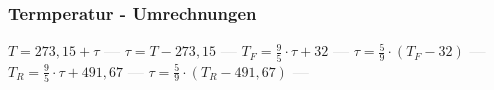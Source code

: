 \subsubsection{Termperatur - Umrechnungen} 
\begin{minipage}{0.45\textwidth} 
\end{minipage} 
\begin{minipage}{0.45\textwidth} 
 
\end{minipage} 
$ T = 273,15 + \tau $ \textcolor{lightgray}{\textbf{---}} 
$ \tau  = T-273,15 $ \textcolor{lightgray}{\textbf{---}} 
$ T_{F}  = \frac{9}{5}\cdot \tau  +32 $ \textcolor{lightgray}{\textbf{---}} 
$ \tau  = \frac{5}{9}\cdot (T_{F}  - 32) $ \textcolor{lightgray}{\textbf{---}} 
$ T_{R}  = \frac{9}{5}\cdot \tau  + 491,67 $ \textcolor{lightgray}{\textbf{---}} 
$ \tau  = \frac{5}{9}\cdot (T_{R}  - 491,67) $ \textcolor{lightgray}{\textbf{---}} 

